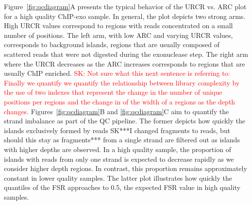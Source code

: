 \documentclass{bmcart}
\newcommand{\SK}[1]{\textcolor{red}{SK: #1}}
\begin{document}
Figure~\ref{fig:qcdiagram}A presents
the typical behavior of the URCR vs. ARC plot for a high quality ChIP-exo sample. In general, the plot
depicts two strong arms. 
High URCR values correspond to regions with reads
concentrated on a small number of positions. 
The  left arm, with low ARC  and
varying URCR values,  corresponds to  background islands, regions that
are usually composed of scattered reads that were not digested during
the exonuclease step. The right arm  where the URCR decreases as the
ARC increases  corresponds to regions that are usually ChIP enriched.
\SK{Not sure what this next sentence is referring to: Finally we quantify we quantify the
relationship between library complexity by the use of two indexes that
represent the change in the number of unique positions per regions and
the change in of the width of a regions as the depth changes. }
Figures~\ref{fig:qcdiagram}B and \ref{fig:qcdiagram}C aim to quantify the strand imbalance as part of the QC pipeline. The former  depicts how
quickly the islands exclusively formed by reads SK{***I changed fragments to reads, but should this stay as fragments***} from a single strand are  filtered out as islands with higher depths are observed. In a
high quality sample,  the proportion of islands with reads from only one strand 
is expected to decrease rapidly  as we consider higher depth regions. In contrast, 
 this proportion remains
approximately constant in  lower quality samples. The latter plot illustrates how quickly the quantiles of 
the  FSR approaches to 0.5, the expected  FSR value in high quality samples.
\end{document}
